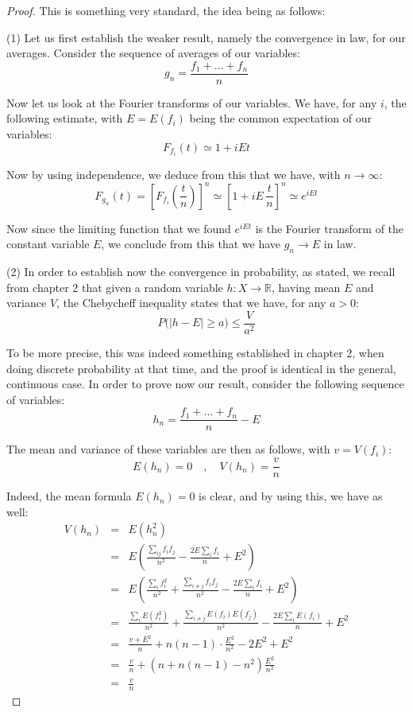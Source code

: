 \documentclass[12pt]{amsbook}
\begin{document}
\begin{proof}
This is something very standard, the idea being as follows:

\medskip

(1) Let us first establish the weaker result, namely the convergence in law, for our averages. Consider the sequence of averages of our variables:
$$g_n=\frac{f_1+\ldots+f_n}{n}$$

Now let us look at the Fourier transforms of our variables. We have, for any $i$, the following estimate, with $E=E(f_i)$ being the common expectation of our variables:
$$F_{f_i}(t)\simeq 1+iEt$$

Now by using independence, we deduce from this that we have, with $n\to\infty$:
$$F_{g_n}(t)
=\left[F_{f_i}\left(\frac{t}{n}\right)\right]^n
\simeq\left[1+iE\,\frac{t}{n}\right]^n
\simeq e^{iEt}$$

Now since the limiting function that we found $e^{iEt}$ is the Fourier transform of the constant variable $E$, we conclude from this that we have $g_n\to E$ in law.

\medskip

(2) In order to establish now the convergence in probability, as stated, we recall from chapter 2 that given a random variable $h:X\to\mathbb R$, having mean $E$ and variance $V$, the Chebycheff inequality states that we have, for any $a>0$:
$$P\big(|h-E|\geq a\big)\leq\frac{V}{a^2}$$

To be more precise, this was indeed something established in chapter 2, when doing discrete probability at that time, and the proof is identical in the general, continuous case. In order to prove now our result, consider the following sequence of variables:
$$h_n=\frac{f_1+\ldots+f_n}{n}-E$$

The mean and variance of these variables are then as follows, with $v=V(f_i)$:
$$E(h_n)=0\quad,\quad V(h_n)=\frac{v}{n}$$

Indeed, the mean formula $E(h_n)=0$ is clear, and by using this, we have as well:
\begin{eqnarray*}
V(h_n)
&=&E(h_n^2)\\
&=&E\left(\frac{\sum_{ij}f_if_j}{n^2}-\frac{2E\sum_if_i}{n}+E^2\right)\\
&=&E\left(\frac{\sum_if_i^2}{n^2}+\frac{\sum_{i\neq j}f_if_j}{n^2}-\frac{2E\sum_if_i}{n}+E^2\right)\\
&=&\frac{\sum_iE(f_i^2)}{n^2}+\frac{\sum_{i\neq j}E(f_i)E(f_j)}{n^2}-\frac{2E\sum_iE(f_i)}{n}+E^2\\
&=&\frac{v+E^2}{n}+n(n-1)\cdot\frac{E^2}{n^2}-2E^2+E^2\\
&=&\frac{v}{n}+\left(n+n(n-1)-n^2\right)\frac{E^2}{n^2}\\
&=&\frac{v}{n}
\end{eqnarray*}


\end{proof}
\end{document}

